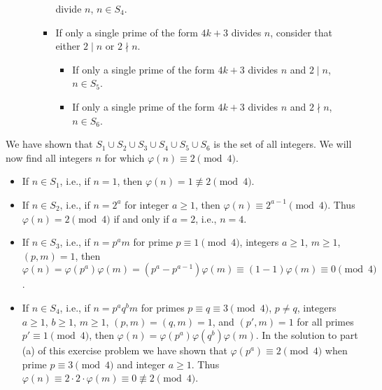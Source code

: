 \begin{solution}
\begin{itemize}
\begin{itemize}
\begin{itemize}
            divide \( n \), \( n \in S_4 \).
          \item
            If only a single prime of the form \( 4k + 3 \) divides \(
            n \), consider that either \( 2 \mid n \) or \( 2 \nmid n
            \).
            \begin{itemize}
              \item
                If only a single prime of the form \( 4k + 3 \)
                divides \( n \) and \( 2 \mid n \), \( n \in S_5 \).
              \item
                If only a single prime of the form \( 4k + 3 \)
                divides \( n \) and \( 2 \nmid n \), \( n \in S_6 \).
            \end{itemize}
          \end{itemize}
      \end{itemize}
  \end{itemize}
  We have shown that \( S_1 \cup S_2 \cup S_3 \cup S_4 \cup S_5 \cup
  S_6 \) is the set of all integers. We will now find all integers \(
  n \) for which \( \varphi(n) \equiv 2 \pmod{4} \). 
  \begin{itemize}
  \item
    If \( n \in S_1 \), i.e., if \( n = 1 \), then \( \varphi(n) = 1
    \not\equiv 2 \pmod{4} \).
  \item
    If \( n \in S_2 \), i.e., if \( n = 2^a \) for integer \( a \ge 1
    \), then \( \varphi(n) \equiv 2^{a - 1} \pmod{4} \). Thus \(
    \varphi(n) = 2 \pmod{4} \) if and only if \( a = 2 \), i.e., \( n
    = 4 \).
  \item
    If \( n \in S_3 \), i.e., if \( n = p^a m \) for prime \( p \equiv
    1 \pmod{4} \), integers \( a \ge 1 \), \( m \ge 1 \), \( (p, m) =
    1 \), then \( \varphi(n) = \varphi(p^a) \varphi(m) = (p^a - p^{a -
      1}) \varphi(m) \equiv (1 - 1) \varphi(m) \equiv 0 \pmod{4} \).
  \item
    If \( n \in S_4 \), i.e., if \( n = p^a q^b m \) for primes \( p
    \equiv q \equiv 3 \pmod{4} \), \( p \neq q \), integers \( a \ge 1
    \), \( b \ge 1 \), \( m \ge 1 \), \( (p, m) = (q, m) = 1 \), and
    \( (p', m) = 1 \) for all primes \( p' \equiv 1 \pmod{4} \), then
    \( \varphi(n) = \varphi(p^a) \varphi(q^b) \varphi(m) \). In the
    solution to part (a) of this exercise problem we have shown that
    \( \varphi(p^a) \equiv 2 \pmod{4} \) when prime \( p \equiv 3
    \pmod{4} \) and integer \( a \ge 1 \). Thus \( \varphi(n) \equiv 2
    \cdot 2 \cdot \varphi(m) \equiv 0 \not\equiv 2 \pmod{4} \).

\end{itemize}
\end{solution}
